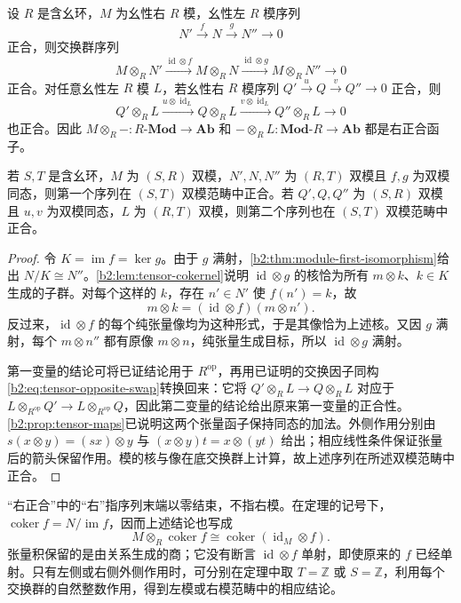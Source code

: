 \begin{theorem}[张量积的右正合性]\label{b2:thm:tensor-right-exact}
	设 \(R\) 是含幺环，\(M\) 为幺性右 \(R\) 模，幺性左 \(R\) 模序列
	\[
		N'\xrightarrow{f}N\xrightarrow{g}N''\longrightarrow0
	\]
	正合，则交换群序列
	\[
		M\otimes_RN'\xrightarrow{\operatorname{id}\otimes f} M\otimes_RN\xrightarrow{\operatorname{id}\otimes g} M\otimes_RN''\longrightarrow0
	\]
	正合。对任意幺性左 \(R\) 模 \(L\)，若幺性右 \(R\) 模序列 \(Q'\xrightarrow{u}Q\xrightarrow{v}Q''\to0\) 正合，则
	\[
		Q'\otimes_RL\xrightarrow{u\otimes\operatorname{id}_L} Q\otimes_RL\xrightarrow{v\otimes\operatorname{id}_L} Q''\otimes_RL\longrightarrow0
	\]
	也正合。因此 \(M\otimes_R-:R\text{-}\mathbf{Mod}\to\mathbf{Ab}\) 和 \(-\otimes_RL:\mathbf{Mod}\text{-}R\to\mathbf{Ab}\) 都是右正合函子。

	若 \(S,T\) 是含幺环，\(M\) 为 \((S,R)\) 双模，\(N',N,N''\) 为 \((R,T)\) 双模且 \(f,g\) 为双模同态，则第一个序列在 \((S,T)\) 双模范畴中正合。若 \(Q',Q,Q''\) 为 \((S,R)\) 双模且 \(u,v\) 为双模同态，\(L\) 为 \((R,T)\) 双模，则第二个序列也在 \((S,T)\) 双模范畴中正合。
\end{theorem}
\begin{proof}
	令 \(K=\operatorname{im}f=\ker g\)。由于 \(g\) 满射，\cref{b2:thm:module-first-isomorphism}给出 \(N/K\cong N''\)。\cref{b2:lem:tensor-cokernel}说明 \(\operatorname{id}\otimes g\) 的核恰为所有 \(m\otimes k\)、\(k\in K\) 生成的子群。对每个这样的 \(k\)，存在 \(n'\in N'\) 使 \(f(n')=k\)，故
	\[
		m\otimes k=(\operatorname{id}\otimes f)(m\otimes n').
	\]
	反过来，\(\operatorname{id}\otimes f\) 的每个纯张量像均为这种形式，于是其像恰为上述核。又因 \(g\) 满射，每个 \(m\otimes n''\) 都有原像 \(m\otimes n\)，纯张量生成目标，所以 \(\operatorname{id}\otimes g\) 满射。

	第一变量的结论可将已证结论用于 \(R^{\mathrm{op}}\)，再用已证明的交换因子同构 \eqref{b2:eq:tensor-opposite-swap}转换回来：它将 \(Q'\otimes_RL\to Q\otimes_RL\) 对应于 \(L\otimes_{R^{\mathrm{op}}}Q'\to L\otimes_{R^{\mathrm{op}}}Q\)，因此第二变量的结论给出原来第一变量的正合性。\cref{b2:prop:tensor-maps}已说明这两个张量函子保持同态的加法。外侧作用分别由 \(s(x\otimes y)=(sx)\otimes y\) 与 \((x\otimes y)t=x\otimes(yt)\) 给出；相应线性条件保证张量后的箭头保留作用。模的核与像在底交换群上计算，故上述序列在所述双模范畴中正合。
\end{proof}

“右正合”中的“右”指序列末端以零结束，不指右模。在定理的记号下，\(\operatorname{coker}f=N/\operatorname{im}f\)，因而上述结论也写成
\[
	M\otimes_R\operatorname{coker}f \cong\operatorname{coker}(\operatorname{id}_M\otimes f).
\]
张量积保留的是由关系生成的商；它没有断言 \(\operatorname{id}\otimes f\) 单射，即使原来的 \(f\) 已经单射。只有左侧或右侧外侧作用时，可分别在定理中取 \(T=\mathbb Z\) 或 \(S=\mathbb Z\)，利用每个交换群的自然整数作用，得到左模或右模范畴中的相应结论。

